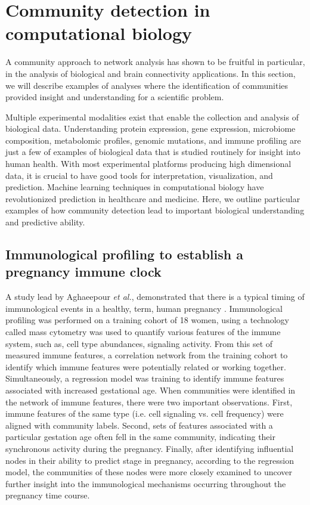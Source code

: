 \section{Community detection in computational biology}
 A community approach to network analysis has shown to be fruitful in particular, in the analysis of biological and brain connectivity applications. In this section, we will describe examples of analyses where the identification of communities provided insight and understanding for a scientific problem. 

Multiple experimental modalities exist that enable the collection and analysis of biological data. Understanding protein expression, gene expression, microbiome composition, metabolomic profiles, genomic mutations, and immune profiling are just a few of examples of biological data that is studied routinely for insight into human health. With most experimental platforms producing high dimensional data, it is crucial to have good tools for interpretation, visualization, and prediction. Machine learning techniques in computational biology have revolutionized prediction in healthcare and medicine. Here, we outline particular examples of how community detection lead to important biological understanding and predictive ability.

\subsection{Immunological profiling to establish a pregnancy immune clock}
A study lead by Aghaeepour \emph{et al.}, demonstrated that there is a typical timing of immunological events in a healthy, term, human pregnancy \cite{immuneClock}. Immunological profiling was performed on a training cohort of 18 women, using a technology called mass cytometry \cite{cytof} was used to quantify various features of the immune system, such as, cell type abundances, signaling activity. From this set of measured immune features, a correlation network from the training cohort to identify which immune features were potentially related or working together. Simultaneously, a regression model was training to identify immune features associated with increased gestational age. When communities were identified in the network of immune features, there were two important observations. First, immune features of the same type (i.e. cell signaling vs. cell frequency) were aligned with community labels. Second, sets of features associated with a particular gestation age often fell in the same community, indicating their synchronous activity during the pregnancy. Finally, after identifying influential nodes in their ability to predict stage in pregnancy, according to the regression model, the communities of these nodes were more closely examined to uncover further insight into the immunological mechanisms occurring throughout the pregnancy time course. 

